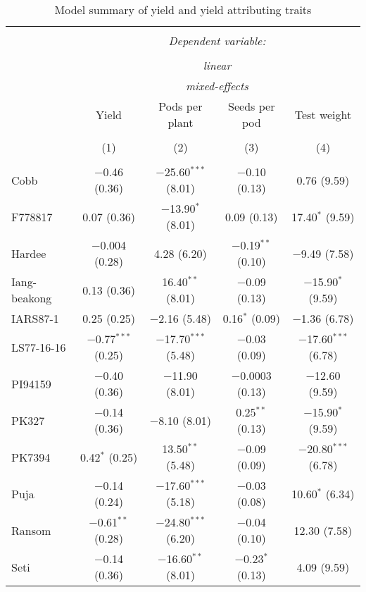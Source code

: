 \documentclass[
]{article}
\begin{document}
\begingroup 
\small 
\begin{longtable}{@{\extracolsep{-10pt}}lcccc} 
\caption{\label{tab:model-summary2}Model summary of yield and yield attributing traits}\\
\\[-1.8ex]\hline 
\hline \\[-1.8ex] 
 & \multicolumn{4}{c}{\textit{Dependent variable:}} \\ 
\cline{2-5} 
\\[-1.8ex] & \multicolumn{4}{c}{\textit{linear}} \\ 
 & \multicolumn{4}{c}{\textit{mixed-effects}} \\ 
 & \parbox[t]{3.0cm}{Yield} & \parbox[t]{3.0cm}{Pods per plant} & \parbox[t]{3.0cm}{Seeds per pod} & \parbox[t]{3.0cm}{Test weight} \\ 
\\[-1.8ex] & (1) & (2) & (3) & (4)\\ 
\hline \\[-1.8ex] 
 Cobb & $-$0.46 (0.36) & $-$25.60$^{***}$ (8.01) & $-$0.10 (0.13) & 0.76 (9.59) \\ 
  F778817 & 0.07 (0.36) & $-$13.90$^{*}$ (8.01) & 0.09 (0.13) & 17.40$^{*}$ (9.59) \\ 
  Hardee & $-$0.004 (0.28) & 4.28 (6.20) & $-$0.19$^{**}$ (0.10) & $-$9.49 (7.58) \\ 
  Iang-beakong & 0.13 (0.36) & 16.40$^{**}$ (8.01) & $-$0.09 (0.13) & $-$15.90$^{*}$ (9.59) \\ 
  IARS87-1 & 0.25 (0.25) & $-$2.16 (5.48) & 0.16$^{*}$ (0.09) & $-$1.36 (6.78) \\ 
  LS77-16-16 & $-$0.77$^{***}$ (0.25) & $-$17.70$^{***}$ (5.48) & $-$0.03 (0.09) & $-$17.60$^{***}$ (6.78) \\ 
  PI94159 & $-$0.40 (0.36) & $-$11.90 (8.01) & $-$0.0003 (0.13) & $-$12.60 (9.59) \\ 
  PK327 & $-$0.14 (0.36) & $-$8.10 (8.01) & 0.25$^{**}$ (0.13) & $-$15.90$^{*}$ (9.59) \\ 
  PK7394 & 0.42$^{*}$ (0.25) & 13.50$^{**}$ (5.48) & $-$0.09 (0.09) & $-$20.80$^{***}$ (6.78) \\ 
  Puja & $-$0.14 (0.24) & $-$17.60$^{***}$ (5.18) & $-$0.03 (0.08) & 10.60$^{*}$ (6.34) \\ 
  Ransom & $-$0.61$^{**}$ (0.28) & $-$24.80$^{***}$ (6.20) & $-$0.04 (0.10) & 12.30 (7.58) \\ 
  Seti & $-$0.14 (0.36) & $-$16.60$^{**}$ (8.01) & $-$0.23$^{*}$ (0.13) & 4.09 (9.59) \\ 

\end{longtable}
\end{document}
